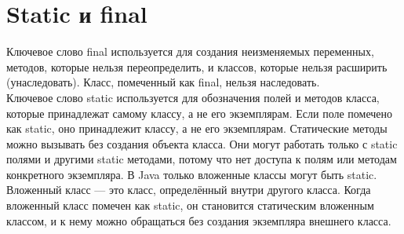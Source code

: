 \section{Static и final}
Ключевое слово final используется для создания неизменяемых переменных, методов, которые нельзя переопределить, и классов, которые нельзя расширить (унаследовать). Класс, помеченный как final, нельзя наследовать. \\
Ключевое слово static используется для обозначения полей и методов класса, которые принадлежат самому классу, а не его экземплярам. Если поле помечено как static, оно принадлежит классу, а не его экземплярам. Статические методы можно вызывать без создания объекта класса. Они могут работать только с static полями и другими static методами, потому что нет доступа к полям или методам конкретного экземпляра. В Java только вложенные классы могут быть static. Вложенный класс — это класс, определённый внутри другого класса. Когда вложенный класс помечен как static, он становится статическим вложенным классом, и к нему можно обращаться без создания экземпляра внешнего класса.
